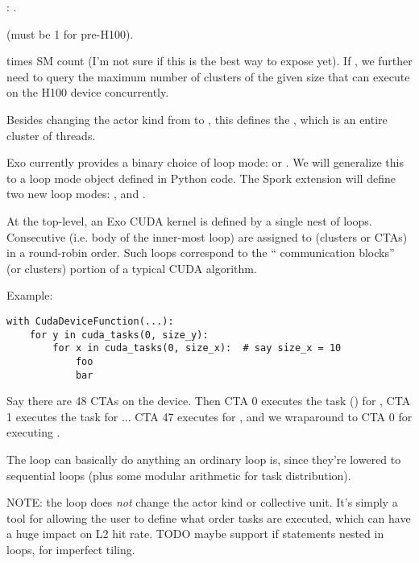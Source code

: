 \filbreak
{}: .

\filbreak
{}  (must be 1 for pre-H100).

\filbreak
{}  times SM count (I'm not sure if this is the best way to expose  yet).
If , we further need to query the maximum number of clusters of the given size that can execute on the H100 device concurrently.

\filbreak
{} Besides changing the actor kind from  to , this defines the , which is an entire cluster of  threads.

\filbreak
{}

Exo currently provides a binary choice of loop mode:  or .
We will generalize this to a loop mode object defined in Python code.
The Spork extension will define two new loop modes: , and .

\filbreak
{} At the top-level, an Exo CUDA kernel is defined by a single nest of  loops.
Consecutive  (i.e. body of the inner-most  loop) are assigned to  (clusters or CTAs) in a round-robin order.
Such loops correspond to the `` communication  blocks'' (or clusters) portion of a typical CUDA algorithm.

\filbreak
Example:
{\color{lightttColor}
\begin{verbatim}
with CudaDeviceFunction(...):
    for y in cuda_tasks(0, size_y):
        for x in cuda_tasks(0, size_x):  # say size_x = 10
            foo
            bar
\end{verbatim}
}
Say there are 48 CTAs on the device.
Then CTA 0 executes the task () for , CTA 1 executes the task for  ... CTA 47 executes for , and we wraparound to CTA 0 for executing .

\filbreak
The  loop can basically do anything an ordinary  loop is, since they're lowered to sequential loops (plus some modular arithmetic for task distribution).

\filbreak
NOTE: the  loop does \textit{not} change the actor kind or collective unit.
It's simply a tool for allowing the user to define what order tasks are executed, which can have a huge impact on L2 hit rate.
TODO maybe support if statements nested in  loops, for imperfect tiling.


